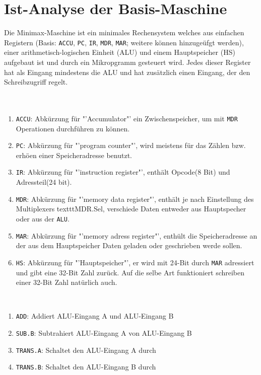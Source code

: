 \documentclass[12pt,titlepage]{article}
\begin{document}
\newpage

\section{Ist-Analyse der Basis-Maschine}

Die Minimax-Maschine ist ein minimales Rechensystem welches aus einfachen Registern (Basis: \texttt{ACCU}, \texttt{PC}, \texttt{IR}, \texttt{MDR}, \texttt{MAR};
weitere k{\"o}nnen hinzuge{\"u}fgt werden), einer arithmetisch-logischen Einheit (ALU) und einem Hauptspeicher (HS) aufgebaut
ist und durch ein Mikropgramm gesteuert wird. Jedes dieser Register hat als Eingang mindestens die ALU und hat zusätzlich einen Eingang, der den Schreibzugriff regelt.\\
\leavevmode \\
\\
\begin{enumerate}
\item \texttt{ACCU}: Abk{\"u}rzung f{\"u}r "'Accumulator"' ein Zwischenspeicher, um mit \texttt{MDR} Operationen durchführen zu k{\"o}nnen.
\item \texttt{PC}: Abk{\"u}rzung f{\"u}r "'program counter"', wird meistens f{\"u}r das Z{\"a}hlen bzw. erh{\"o}en einer Speicheradresse benutzt.
\item \texttt{IR}: Abk{\"u}rzung f{\"u}r "'instruction register"', enthält Opcode(8 Bit) und Adressteil(24 bit).
\item \texttt{MDR}: Abk{\"u}rzung f{\"u}r "'memory data register"', enthält je nach Einstellung des Multiplexers texttt{MDR.Sel}, verschiede Daten entweder aus Hauptspecher oder aus der \texttt{ALU}.
\item \texttt{MAR}: Abk{\"u}rzung f{\"u}r "'memory adress register"', enth{\"u}lt die Speicheradresse an der aus dem Hauptspeicher Daten geladen oder geschrieben werde sollen.
\item \texttt{HS}: Abk{\"u}rzung f{\"u}r "'Hauptspeicher"', er wird mit 24-Bit durch \texttt{MAR} adressiert und gibt eine 32-Bit Zahl zur{\"u}ck. Auf die selbe Art funktioniert schreiben einer 32-Bit Zahl nat{\"u}rlich auch.
\end{enumerate}
\leavevmode \\
\begin{enumerate}
\item \texttt{ADD}: Addiert ALU-Eingang A und ALU-Eingang B
\item \texttt{SUB.B}: Subtrahiert ALU-Eingang A von ALU-Eingang B
\item \texttt{TRANS.A}: Schaltet den ALU-Eingang A durch
\item \texttt{TRANS.B}: Schaltet den ALU-Eingang B durch
\end{enumerate}
\end{document}

